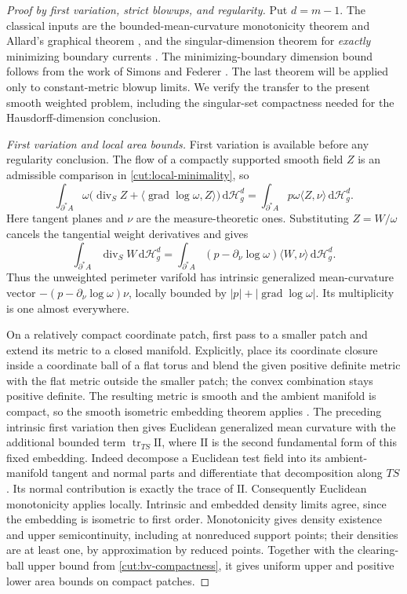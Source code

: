 \documentclass[11pt]{article}
\numberwithin{equation}{section}
\theoremstyle{definition}
\theoremstyle{remark}
\begin{document}
\begin{proof}[Proof by first variation, strict blowups, and regularity]
Put $d=m-1$.  The classical inputs are the bounded-mean-curvature
monotonicity theorem and Allard's graphical theorem
\citep[Chapter~4, Theorem~3.17; Chapter~5, hypotheses~5.1 and
Theorem~5.2]{simonGMT}, and the singular-dimension theorem for
\emph{exactly} minimizing boundary currents
\citep[Chapter~7, Theorem~5.8]{simonGMT}.  The minimizing-boundary dimension bound follows from the work of
Simons and Federer \citep{simons1968,federer1970}. The last theorem will be applied
only to constant-metric blowup limits.  We verify the transfer to the
present smooth weighted problem, including the singular-set compactness
needed for the Hausdorff-dimension conclusion.

\emph{First variation and local area bounds.}
First variation is available before any regularity conclusion.  The
flow of a compactly supported smooth field $Z$ is an admissible
comparison in \eqref{cut:local-minimality}, so
\[
 \int_{\partial^*A}\omega
   \bigl(\operatorname{div}_S Z+\langle\operatorname{grad}\log\omega,Z\rangle\bigr)
       \,\mathrm d\mathcal H_g^d
 =\int_{\partial^*A}p\omega\langle Z,\nu\rangle
       \,\mathrm d\mathcal H_g^d.
\]
Here tangent planes and $\nu$ are the measure-theoretic ones.  Substituting
$Z=W/\omega$ cancels the tangential weight derivatives and gives
\[
 \int_{\partial^*A}\operatorname{div}_S W\,\mathrm d\mathcal H_g^d
  =\int_{\partial^*A}
       (p-\partial_\nu\log\omega)\langle W,\nu\rangle
          \,\mathrm d\mathcal H_g^d.
\]
Thus the unweighted perimeter varifold has intrinsic generalized
mean-curvature vector
$-(p-\partial_\nu\log\omega)\nu$, locally bounded by
$|p|+|\operatorname{grad}\log\omega|$.  Its multiplicity is one almost everywhere.

On a relatively compact coordinate patch, first pass to a smaller
patch and extend its metric to a closed manifold.  Explicitly, place
its coordinate closure inside a coordinate ball of a flat torus and
blend the given positive definite metric with the flat metric outside
the smaller patch; the convex combination stays positive definite.
The resulting metric is smooth and the ambient manifold is compact,
so the smooth isometric embedding theorem applies
\citep[Theorem~2]{nash1956}.  The preceding intrinsic first variation then gives
Euclidean generalized mean curvature with the additional bounded term
$\operatorname{tr}_{TS}\mathrm{II}$, where $\mathrm{II}$ is the second fundamental
form of this fixed embedding.  Indeed decompose a Euclidean test field
into its ambient-manifold tangent and normal parts and differentiate
that decomposition along $TS$.  Its normal contribution is exactly the
trace of $\mathrm{II}$.  Consequently Euclidean monotonicity applies
locally.  Intrinsic and embedded density limits agree, since the
embedding is isometric to first order.  Monotonicity gives density
existence and upper semicontinuity, including at nonreduced support
points; their densities are at least one, by approximation by reduced
points.  Together with the clearing-ball upper bound from
\cref{cut:bv-compactness}, it gives uniform upper and positive lower
area bounds on compact patches.


\end{proof}
\end{document}
